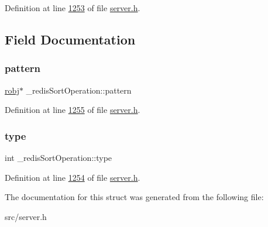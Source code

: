 Definition at line \hyperlink{server_8h_source_l01253}{1253} of file \hyperlink{server_8h_source}{server.\+h}.



\subsection{Field Documentation}
\mbox{\label{struct__redisSortOperation_adf9bf02d385c5a695c4a2b93bd6a4b0f}} 
\subsubsection{\texorpdfstring{pattern}{pattern}}
{\footnotesize\ttfamily \hyperlink{structredisObject}{robj}$\ast$ \+\_\+redis\+Sort\+Operation\+::pattern}



Definition at line \hyperlink{server_8h_source_l01255}{1255} of file \hyperlink{server_8h_source}{server.\+h}.

\mbox{\label{struct__redisSortOperation_aa15685700428f4fe6cb63518eb8c5adc}} 
\subsubsection{\texorpdfstring{type}{type}}
{\footnotesize\ttfamily int \+\_\+redis\+Sort\+Operation\+::type}



Definition at line \hyperlink{server_8h_source_l01254}{1254} of file \hyperlink{server_8h_source}{server.\+h}.



The documentation for this struct was generated from the following file\+:\begin{DoxyCompactItemize}
\item 
src/server.\+h\end{DoxyCompactItemize}
